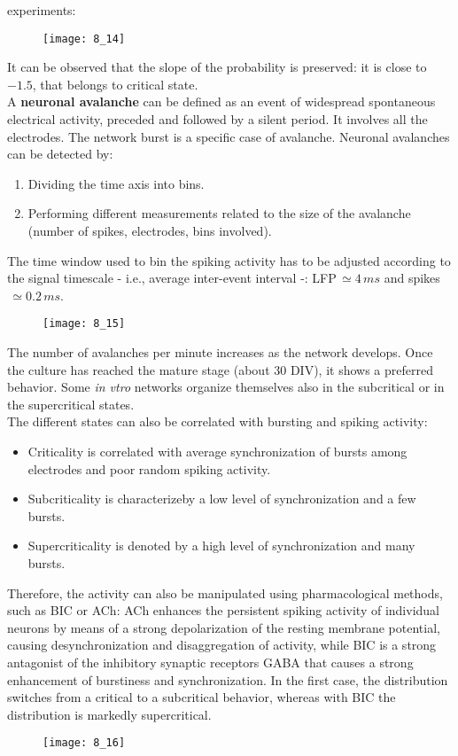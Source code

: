 experiments:
\begin{figure}[H]
    \texttt{[image: 8\_14]}
    \centering
\end{figure}
It can be observed that the slope of the probability is preserved: it is close to \(-1.5\),
that belongs to critical state.\\
A \textbf{neuronal avalanche} can be defined as an event of widespread spontaneous electrical
activity, preceded and followed by a silent period. It involves all the electrodes.
The network burst is a specific case of avalanche. Neuronal avalanches can be detected by:
\begin{enumerate}
    \item Dividing the time axis into bins.
    \item Performing different measurements related to the size of the avalanche
          (number of spikes, electrodes, bins involved).
\end{enumerate}
The time window used to bin the spiking activity has to be adjusted according to the
signal timescale - i.e., average inter-event interval -: LFP\(\,\simeq4\,ms\) and
spikes\(\,\simeq0.2\,ms\).
\begin{figure}[H]
    \texttt{[image: 8\_15]}
    \centering
\end{figure}
The number of avalanches per minute increases as the network develops. Once the culture has
reached the mature stage (about 30 DIV), it shows a preferred behavior. Some \textit{in vtro}
networks organize themselves also in the subcritical or in the supercritical states.\\
The different states can also be correlated with bursting and spiking activity:
\begin{itemize}
    \item Criticality is correlated with average synchronization of bursts among electrodes
          and poor random spiking activity.
    \item Subcriticality is characterizeby a low level of synchronization and a few bursts.
    \item Supercriticality is denoted by a high level of synchronization and many bursts.
\end{itemize}
Therefore, the activity can also be manipulated using pharmacological methods, such as BIC
or ACh: ACh enhances the persistent spiking activity of individual neurons by means of a
strong depolarization of the resting membrane potential, causing desynchronization and
disaggregation of activity, while BIC is a strong antagonist of the inhibitory synaptic
receptors GABA that causes a strong enhancement of burstiness and synchronization.
In the first case, the distribution switches from a critical to a subcritical behavior,
whereas with BIC the distribution is markedly supercritical.
\begin{figure}[H]
    \texttt{[image: 8\_16]}
    \centering
\end{figure}
